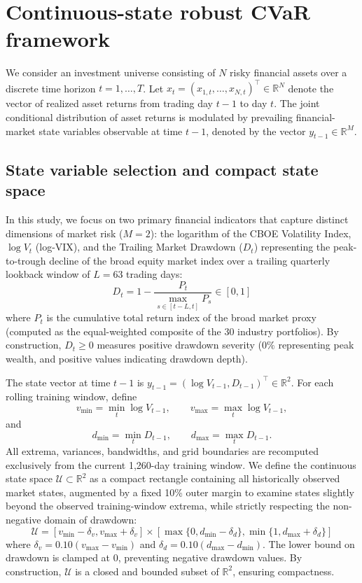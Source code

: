 \documentclass[11pt, a4paper]{article}
\begin{document}
\section{Continuous-state robust CVaR framework}
We consider an investment universe consisting of $N$ risky financial assets over a discrete time horizon $t = 1, \dots, T$. Let $x_t = (x_{1,t}, \dots, x_{N,t})^\top \in \mathbb{R}^N$ denote the vector of realized asset returns from trading day $t-1$ to day $t$. The joint conditional distribution of asset returns is modulated by prevailing financial-market state variables observable at time $t-1$, denoted by the vector $y_{t-1} \in \mathbb{R}^M$.

\subsection{State variable selection and compact state space}
In this study, we focus on two primary financial indicators that capture distinct dimensions of market risk ($M = 2$): the logarithm of the CBOE Volatility Index, $\log V_t$ (log-VIX), and the Trailing Market Drawdown ($D_t$) representing the peak-to-trough decline of the broad equity market index over a trailing quarterly lookback window of $L = 63$ trading days:
\begin{equation}
    D_t = 1 - \frac{P_t}{\max_{s \in [t-L, t]} P_s} \in [0, 1]
\end{equation}
where $P_t$ is the cumulative total return index of the broad market proxy (computed as the equal-weighted composite of the 30 industry portfolios). By construction, $D_t \ge 0$ measures positive drawdown severity ($0\%$ representing peak wealth, and positive values indicating drawdown depth).

The state vector at time $t-1$ is $y_{t-1} = (\log V_{t-1}, D_{t-1})^\top \in \mathbb{R}^2$. For each rolling training window, define
\begin{equation}
v_{\min}=\min_t \log V_{t-1},\qquad v_{\max}=\max_t \log V_{t-1},
\end{equation}
and
\begin{equation}
d_{\min}=\min_t D_{t-1},\qquad d_{\max}=\max_t D_{t-1}.
\end{equation}
All extrema, variances, bandwidths, and grid boundaries are recomputed exclusively from the current 1,260-day training window. We define the continuous state space $\mathcal{U} \subset \mathbb{R}^2$ as a compact rectangle containing all historically observed market states, augmented by a fixed 10\% outer margin to examine states slightly beyond the observed training-window extrema, while strictly respecting the non-negative domain of drawdown:
\begin{equation}
    \mathcal{U} = [v_{\min} - \delta_v, v_{\max} + \delta_v] \times [\max\{0, d_{\min} - \delta_d\}, \min\{1, d_{\max} + \delta_d\}]
\end{equation}
where $\delta_v = 0.10 (v_{\max} - v_{\min})$ and $\delta_d = 0.10 (d_{\max} - d_{\min})$. The lower bound on drawdown is clamped at 0, preventing negative drawdown values. By construction, $\mathcal{U}$ is a closed and bounded subset of $\mathbb{R}^2$, ensuring compactness.
\end{document}
